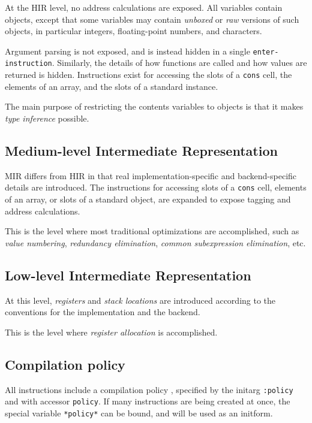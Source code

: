 At the HIR level, no address calculations are exposed.  All variables
contain \commonlisp{} objects, except that some variables may contain
\emph{unboxed} or \emph{raw} versions of such objects, in particular
integers, floating-point numbers, and characters.

Argument parsing is not exposed, and is instead hidden in a single
\texttt{enter-instruction}.  Similarly, the details of how functions
are called and how values are returned is hidden.  Instructions exist
for accessing the slots of a \texttt{cons} cell, the elements of an
array, and the slots of a standard instance.

The main purpose of restricting the contents variables to
\commonlisp{} objects is that it makes \emph{type inference}
possible.

\subsection{Medium-level Intermediate Representation}

MIR differs from HIR in that real implementation-specific and
backend-specific details are introduced.  The instructions for
accessing slots of a \texttt{cons} cell, elements of an array, or
slots of a standard object, are expanded to expose tagging and address
calculations.

This is the level where most traditional optimizations are
accomplished, such as \emph{value numbering}, \emph{redundancy
  elimination}, \emph{common subexpression elimination}, etc.

\subsection{Low-level Intermediate Representation}

At this level, \emph{registers} and \emph{stack locations} are
introduced according to the conventions for the implementation and the
backend.

This is the level where \emph{register allocation} is accomplished.

\subsection{Compilation policy}

All instructions include a compilation policy ,
specified by the initarg \texttt{:policy} and with accessor
\texttt{policy}. If many instructions are being created at once, the
special variable \texttt{*policy*} can be bound, and will be used
as an initform.

